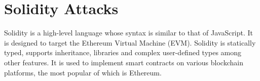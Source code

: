 \chapter{Solidity Attacks}
Solidity is a high-level language whose syntax is similar to that of JavaScript. It is designed to target the Ethereum Virtual Machine (EVM). Solidity is statically typed, supports inheritance, libraries and complex user-defined types among other features. It is used to implement smart contracts on various blockchain platforms, the most popular of which is Ethereum.